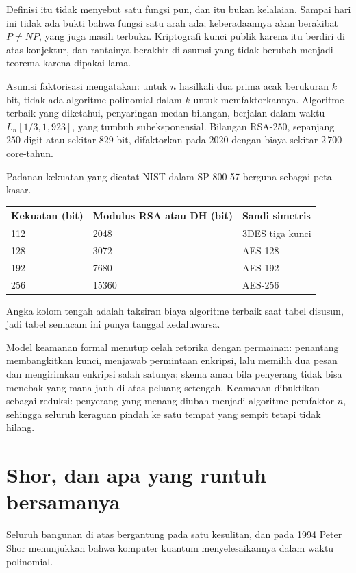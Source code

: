 Definisi itu tidak menyebut satu fungsi pun, dan itu bukan kelalaian. Sampai hari ini tidak ada
bukti bahwa fungsi satu arah ada; keberadaannya akan berakibat $P\neq NP$, yang juga masih
terbuka. Kriptografi kunci publik karena itu berdiri di atas konjektur, dan rantainya berakhir di
asumsi yang tidak berubah menjadi teorema karena dipakai lama.

Asumsi faktorisasi mengatakan: untuk $n$ hasilkali dua prima acak berukuran $k$ bit, tidak ada
algoritme polinomial dalam $k$ untuk memfaktorkannya. Algoritme terbaik yang diketahui,
penyaringan medan bilangan, berjalan dalam waktu $L_n[1/3,1{,}923]$, yang tumbuh
subeksponensial. Bilangan RSA-250, sepanjang $250$ digit atau sekitar $829$ bit, difaktorkan
pada 2020 dengan biaya sekitar $2\,700$ core-tahun.

Padanan kekuatan yang dicatat NIST dalam SP 800-57 berguna sebagai peta kasar.

\begin{center}
\small
\begin{tabular}{@{}lll@{}}
\toprule
Kekuatan (bit) & Modulus RSA atau DH (bit) & Sandi simetris \\
\midrule
112 & 2048 & 3DES tiga kunci \\
128 & 3072 & AES-128 \\
192 & 7680 & AES-192 \\
256 & 15360 & AES-256 \\
\bottomrule
\end{tabular}
\end{center}

Angka kolom tengah adalah taksiran biaya algoritme terbaik saat tabel disusun, jadi tabel
semacam ini punya tanggal kedaluwarsa.

Model keamanan formal menutup celah retorika dengan permainan: penantang membangkitkan kunci,
menjawab permintaan enkripsi, lalu memilih dua pesan dan mengirimkan enkripsi salah satunya;
skema aman bila penyerang tidak bisa menebak yang mana jauh di atas peluang setengah. Keamanan
dibuktikan sebagai reduksi: penyerang yang menang diubah menjadi algoritme pemfaktor $n$,
sehingga seluruh keraguan pindah ke satu tempat yang sempit tetapi tidak hilang.

\section{Shor, dan apa yang runtuh bersamanya}

Seluruh bangunan di atas bergantung pada satu kesulitan, dan pada 1994 Peter Shor menunjukkan
bahwa komputer kuantum menyelesaikannya dalam waktu polinomial.

